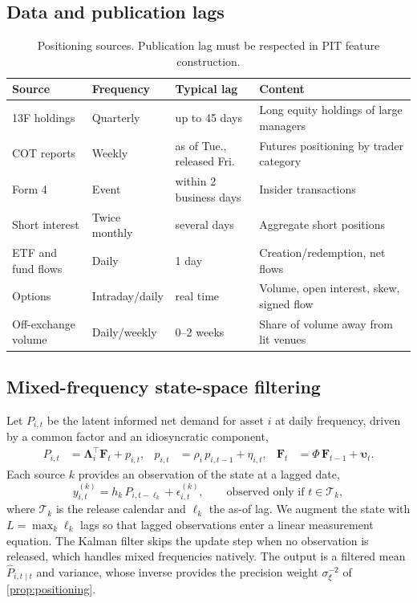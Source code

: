 \documentclass[11pt,a4paper]{article}
\theoremstyle{plain}
\theoremstyle{definition}
\theoremstyle{remark}
\begin{document}
\subsection{Data and publication lags}
\begin{table}[ht]
\centering
\caption{Positioning sources. Publication lag must be respected in PIT feature construction.}\label{tab:positioning}
\small
\begin{tabularx}{\textwidth}{@{}lllX@{}}
\toprule
Source & Frequency & Typical lag & Content \\
\midrule
13F holdings & Quarterly & up to 45 days & Long equity holdings of large managers \\
COT reports & Weekly & as of Tue., released Fri. & Futures positioning by trader category \\
Form 4 & Event & within 2 business days & Insider transactions \\
Short interest & Twice monthly & several days & Aggregate short positions \\
ETF and fund flows & Daily & 1 day & Creation/redemption, net flows \\
Options & Intraday/daily & real time & Volume, open interest, skew, signed flow \\
Off-exchange volume & Daily/weekly & 0--2 weeks & Share of volume away from lit venues \\
\bottomrule
\end{tabularx}
\end{table}

\subsection{Mixed-frequency state-space filtering}
Let $P_{i,t}$ be the latent informed net demand for asset $i$ at daily frequency, driven by a common factor and an idiosyncratic component,
\begin{align}
  P_{i,t}&=\bm\Lambda_i^\top\bm F_t+p_{i,t}, & p_{i,t}&=\rho_i\,p_{i,t-1}+\eta_{i,t}, & \bm F_t&=\Phi\,\bm F_{t-1}+\bm\upsilon_t .
\end{align}
Each source $k$ provides an observation of the state at a lagged date,
\begin{equation}
  y^{(k)}_{i,t}=h_k\,P_{i,t-\ell_k}+\epsilon^{(k)}_{i,t},\qquad \text{observed only if } t\in\mathcal{T}_k,
\end{equation}
where $\mathcal{T}_k$ is the release calendar and $\ell_k$ the as-of lag. We augment the state with $L=\max_k\ell_k$ lags so that lagged observations enter a linear measurement equation. The Kalman filter skips the update step when no observation is released, which handles mixed frequencies natively. The output is a filtered mean $\hat P_{i,t\mid t}$ and variance, whose inverse provides the precision weight $\sigma_\xi^{-2}$ of \cref{prop:positioning}.
\end{document}
